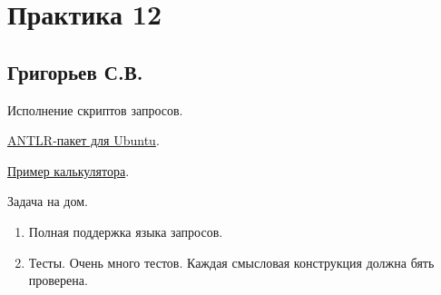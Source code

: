 \section{Практика 12}

\subsection{Григорьев С.В.}


Исполнение скриптов запросов.

\href{https://packages.ubuntu.com/search?keywords=antlr4}{ANTLR-пакет для Ubuntu}.

\href{https://github.com/shmatov/antlr4-calculator}{Пример калькулятора}.


Задача на дом.
\begin{enumerate}
  \item Полная поддержка языка запросов. 
  \item Тесты. Очень много тестов. Каждая смысловая конструкция должна бять проверена. 

\end{enumerate}